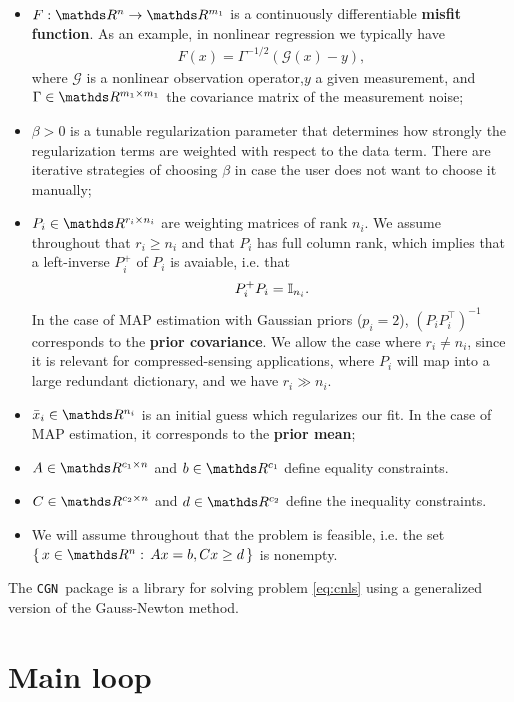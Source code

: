 \documentclass{article}
\numberwithin{equation}{section}
\theoremstyle{nonumberplain}
\newcommand{\fun}{ F }
\newcommand{\cgn}{{\texttt{CGN}}~}
\begin{document}
\begin{itemize}
\item $F: \R^n \to \R^{m_1}$ is a continuously differentiable \textbf{misfit function}. As an example, in nonlinear regression we typically have
\begin{align*}
\fun(x) = \Gamma^{-1/2}(\mathcal G(x) - y),
\end{align*}
where $\mathcal G$ is a nonlinear observation operator,$y$ a given measurement, and $\Gamma \in \R^{m_1\times m_1}$ the covariance matrix of the measurement noise;
\item $\beta > 0$ is a tunable regularization parameter that determines how strongly the regularization terms are weighted with respect to the data term. There are iterative strategies of choosing $\beta$ in case the user does not want to choose it manually; 
\item $P_i \in \R^{r_i \times n_i}$ are weighting matrices of rank $n_i$. We assume throughout that $r_i \geq n_i$ and that $P_i$ has full column rank, which implies that a left-inverse $P_i^+$ of $P_i$ is avaiable, i.e. that
\begin{align*}
P_i^+ P_i = \mathbb{I}_{n_i}.
\end{align*}
In the case of MAP estimation with Gaussian priors ($p_i=2$), $(P_i P_i^\top)^{-1}$ corresponds to the \textbf{prior covariance}. We allow the case where $r_i \neq n_i$, since it is relevant for compressed-sensing applications, where $P_i$ will map into a large redundant dictionary, and we have $r_i \gg n_i$.
\item $\bar x_i \in \R^{n_i}$ is an initial guess which regularizes our fit. In the case of MAP estimation, it corresponds to the \textbf{prior mean};
\item $A \in \R^{c_1 \times n}$ and $b \in \R^{c_1}$ define equality constraints.
\item $C \in \R^{c_2 \times n}$ and $d \in \R^{c_2}$ define the inequality constraints.
\item We will assume throughout that the problem is feasible, i.e. the set $\Set{ x \in \R^n }{ Ax = b, Cx \geq d}$ is nonempty.
\end{itemize}

The \cgn package is a library for solving problem \eqref{eq:cnls} using a generalized version of the Gauss-Newton method.


\section{Main loop}
\end{document}
